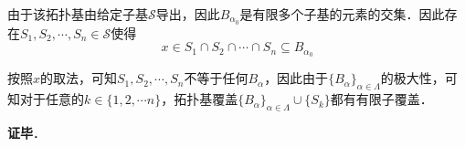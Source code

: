 由于该拓扑基由给定子基$\mathcal{S}$导出，因此$B_{\alpha_0}$是有限多个子基的元素的交集．因此存在$S_1, S_2, \cdots, S_n\in\mathcal{S}$使得
\begin{equation}
x\in S_1\cap S_2\cap\cdots\cap S_n \subseteq B_{\alpha_0}
\end{equation}

按照$x$的取法，可知$S_1, S_2, \cdots, S_n$不等于任何$B_\alpha$，因此由于$\{B_\alpha\}_{\alpha\in\Lambda}$的极大性，可知对于任意的$k\in\{1, 2, \cdots n\}$，拓扑基覆盖$\{B_\alpha\}_{\alpha\in\Lambda}\cup \{S_k\}$都有有限子覆盖．












\textbf{证毕}．























